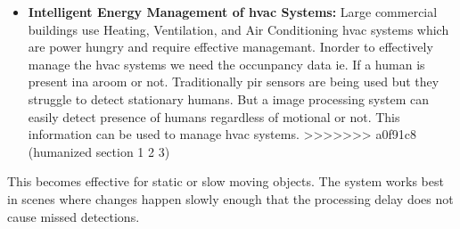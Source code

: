 \begin{itemize}
\item \textbf{Intelligent Energy Management of \gls{hvac} Systems:} Large commercial buildings use Heating, Ventilation, and Air Conditioning \gls{hvac} systems which are power hungry and require effective managemant. Inorder to effectively manage the \gls{hvac} systems we need the occunpancy data ie. If a human is present ina aroom or not. Traditionally \gls{pir} sensors are being used but they struggle to detect stationary humans. But a image processing system can easily detect presence of humans regardless of motional or not. This information can be used to manage \gls{hvac} systems. 
>>>>>>> a0f91c8 (humanized section 1 2 3)
\end{itemize}
This becomes effective for static or slow moving objects. The system works best in scenes where changes happen slowly enough that the processing delay does not cause missed detections.
